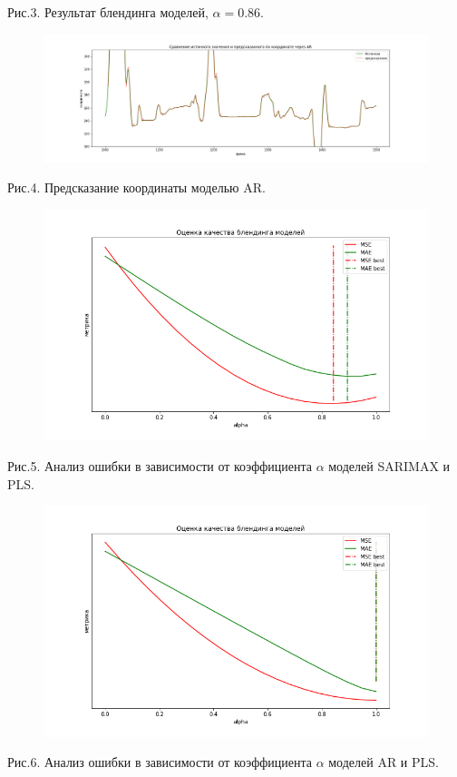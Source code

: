 \documentclass{article}
\begin{document}
Рис.3. Результат блендинга моделей, $\alpha = 0.86$.
\begin{figure}[H]
\includegraphics[scale=0.34]{images/4.png}
\end{figure}
Рис.4. Предсказание координаты моделью AR.
\begin{figure}[H]
\includegraphics[scale=0.34]{images/5.png}
\end{figure}
Рис.5. Анализ ошибки в зависимости от коэффициента $\alpha$ моделей SARIMAX и PLS.
\begin{figure}[H]
\includegraphics[scale=0.34]{images/6.png}
\end{figure}
Рис.6. Анализ ошибки в зависимости от коэффициента $\alpha$ моделей AR и PLS.
\end{document}
